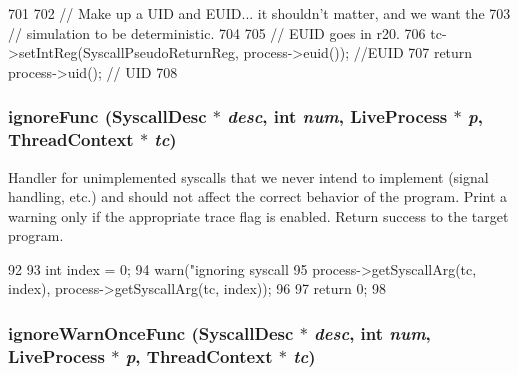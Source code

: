 \begin{DoxyCode}
701 {
702     // Make up a UID and EUID... it shouldn't matter, and we want the
703     // simulation to be deterministic.
704 
705     // EUID goes in r20.
706     tc->setIntReg(SyscallPseudoReturnReg, process->euid()); //EUID
707     return process->uid();              // UID
708 }
\end{DoxyCode}
\hypertarget{syscall__emul_8hh_a8f35ef9e245d5ed14d8080adec47f75e}{
\subsubsection[{ignoreFunc}]{ ignoreFunc ({\bf SyscallDesc} $\ast$ {\em desc}, \/  int {\em num}, \/  {\bf LiveProcess} $\ast$ {\em p}, \/  {\bf ThreadContext} $\ast$ {\em tc})}}
\label{syscall__emul_8hh_a8f35ef9e245d5ed14d8080adec47f75e}
Handler for unimplemented syscalls that we never intend to implement (signal handling, etc.) and should not affect the correct behavior of the program. Print a warning only if the appropriate trace flag is enabled. Return success to the target program. 


\begin{DoxyCode}
92 {
93     int index = 0;
94     warn("ignoring syscall %
95          process->getSyscallArg(tc, index), process->getSyscallArg(tc, index));
96 
97     return 0;
98 }
\end{DoxyCode}
\hypertarget{syscall__emul_8hh_a9e15ddc8451a50fcb56cb48592a56fe3}{
\subsubsection[{ignoreWarnOnceFunc}]{ ignoreWarnOnceFunc ({\bf SyscallDesc} $\ast$ {\em desc}, \/  int {\em num}, \/  {\bf LiveProcess} $\ast$ {\em p}, \/  {\bf ThreadContext} $\ast$ {\em tc})}}
\label{syscall__emul_8hh_a9e15ddc8451a50fcb56cb48592a56fe3}



